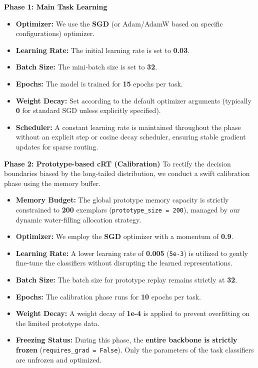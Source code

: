 \documentclass[journal]{IEEEtran}
\theoremstyle{plain}
\theoremstyle{definition}
\theoremstyle{remark}
\begin{document}
\textbf{Phase 1: Main Task Learning}
\begin{itemize}
    \item \textbf{Optimizer:} We use the \textbf{SGD} (or Adam/AdamW based on specific configurations) optimizer.
    \item \textbf{Learning Rate:} The initial learning rate is set to \textbf{0.03}.
    \item \textbf{Batch Size:} The mini-batch size is set to \textbf{32}.
    \item \textbf{Epochs:} The model is trained for \textbf{15} epochs per task.
    \item \textbf{Weight Decay:} Set according to the default optimizer arguments (typically \textbf{0} for standard SGD unless explicitly specified).
    \item \textbf{Scheduler:} A constant learning rate is maintained throughout the phase without an explicit step or cosine decay scheduler, ensuring stable gradient updates for sparse routing.
\end{itemize}

\textbf{Phase 2: Prototype-based cRT (Calibration)}
To rectify the decision boundaries biased by the long-tailed distribution, we conduct a swift calibration phase using the memory buffer.
\begin{itemize}
    \item \textbf{Memory Budget:} The global prototype memory capacity is strictly constrained to \textbf{200} exemplars (\texttt{prototype\_size = 200}), managed by our dynamic water-filling allocation strategy.
    \item \textbf{Optimizer:} We employ the \textbf{SGD} optimizer with a momentum of \textbf{0.9}.
    \item \textbf{Learning Rate:} A lower learning rate of \textbf{0.005} (\texttt{5e-3}) is utilized to gently fine-tune the classifiers without disrupting the learned representations.
    \item \textbf{Batch Size:} The batch size for prototype replay remains strictly at \textbf{32}.
    \item \textbf{Epochs:} The calibration phase runs for \textbf{10} epochs per task.
    \item \textbf{Weight Decay:} A weight decay of \textbf{1e-4} is applied to prevent overfitting on the limited prototype data.
    \item \textbf{Freezing Status:} During this phase, the \textbf{entire backbone is strictly frozen} (\texttt{requires\_grad = False}). Only the parameters of the task classifiers are unfrozen and optimized.
\end{itemize}
\end{document}
